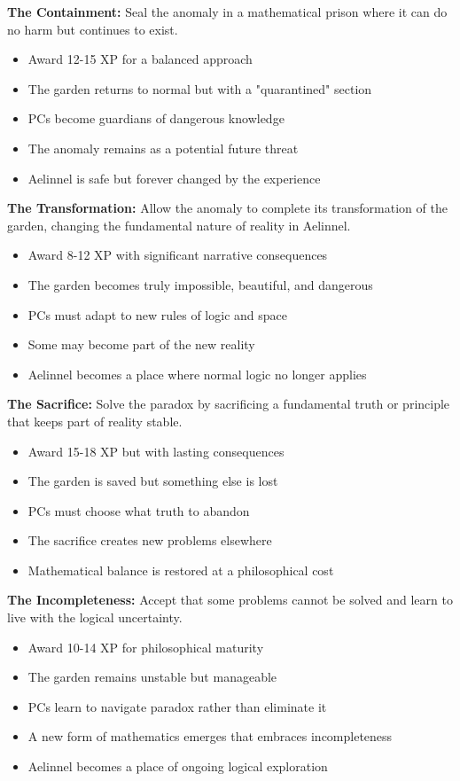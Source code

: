\documentclass[11pt]{article}
\begin{document}
\textbf{The Containment:}
Seal the anomaly in a mathematical prison where it can do no harm but continues to exist.
\begin{itemize}
    \item Award 12-15 XP for a balanced approach
    \item The garden returns to normal but with a "quarantined" section
    \item PCs become guardians of dangerous knowledge
    \item The anomaly remains as a potential future threat
    \item Aelinnel is safe but forever changed by the experience
\end{itemize}

\textbf{The Transformation:}
Allow the anomaly to complete its transformation of the garden, changing the fundamental nature of reality in Aelinnel.
\begin{itemize}
    \item Award 8-12 XP with significant narrative consequences
    \item The garden becomes truly impossible, beautiful, and dangerous
    \item PCs must adapt to new rules of logic and space
    \item Some may become part of the new reality
    \item Aelinnel becomes a place where normal logic no longer applies
\end{itemize}

\textbf{The Sacrifice:}
Solve the paradox by sacrificing a fundamental truth or principle that keeps part of reality stable.
\begin{itemize}
    \item Award 15-18 XP but with lasting consequences
    \item The garden is saved but something else is lost
    \item PCs must choose what truth to abandon
    \item The sacrifice creates new problems elsewhere
    \item Mathematical balance is restored at a philosophical cost
\end{itemize}

\textbf{The Incompleteness:}
Accept that some problems cannot be solved and learn to live with the logical uncertainty.
\begin{itemize}
    \item Award 10-14 XP for philosophical maturity
    \item The garden remains unstable but manageable
    \item PCs learn to navigate paradox rather than eliminate it
    \item A new form of mathematics emerges that embraces incompleteness
    \item Aelinnel becomes a place of ongoing logical exploration
\end{itemize}
\end{document}
